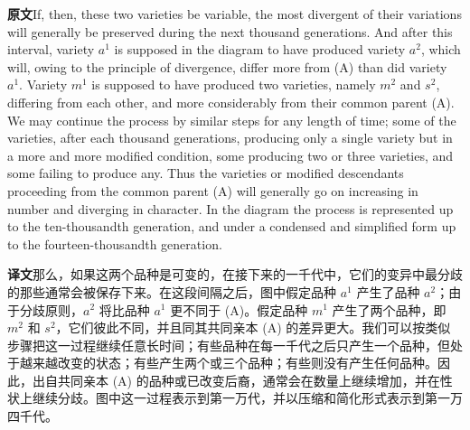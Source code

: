 \documentclass[UTF8,zihao=-4]{ctexart}
\newcommand{\BodyFont}{\fontsize{10.5pt}{15.5pt}\selectfont}
\newcommand{\origlabel}{\textbf{原文}\quad}
\newcommand{\translabel}{\textbf{译文}\quad}
\newenvironment{enblock}{\par\noindent\begingroup\BodyFont\origlabel}{\par\endgroup}
\newenvironment{zhblock}{\par\noindent\begingroup\BodyFont\translabel}{\par\endgroup\vspace{0.35em}}
\newcommand{\pair}[2]{\begin{enblock}#1\end{enblock}\begin{zhblock}#2\end{zhblock}}
\begin{document}
\pair{If, then, these two varieties be variable, the most divergent of their variations will generally be preserved during the next thousand generations. And after this interval, variety $a^{1}$ is supposed in the diagram to have produced variety $a^{2}$, which will, owing to the principle of divergence, differ more from (A) than did variety $a^{1}$. Variety $m^{1}$ is supposed to have produced two varieties, namely $m^{2}$ and $s^{2}$, differing from each other, and more considerably from their common parent (A). We may continue the process by similar steps for any length of time; some of the varieties, after each thousand generations, producing only a single variety but in a more and more modified condition, some producing two or three varieties, and some failing to produce any. Thus the varieties or modified descendants proceeding from the common parent (A) will generally go on increasing in number and diverging in character. In the diagram the process is represented up to the ten-thousandth generation, and under a condensed and simplified form up to the fourteen-thousandth generation.}{那么，如果这两个品种是可变的，在接下来的一千代中，它们的变异中最分歧的那些通常会被保存下来。在这段间隔之后，图中假定品种 $a^{1}$ 产生了品种 $a^{2}$；由于分歧原则，$a^{2}$ 将比品种 $a^{1}$ 更不同于 (A)。假定品种 $m^{1}$ 产生了两个品种，即 $m^{2}$ 和 $s^{2}$，它们彼此不同，并且同其共同亲本 (A) 的差异更大。我们可以按类似步骤把这一过程继续任意长时间；有些品种在每一千代之后只产生一个品种，但处于越来越改变的状态；有些产生两个或三个品种；有些则没有产生任何品种。因此，出自共同亲本 (A) 的品种或已改变后裔，通常会在数量上继续增加，并在性状上继续分歧。图中这一过程表示到第一万代，并以压缩和简化形式表示到第一万四千代。}
\end{document}
